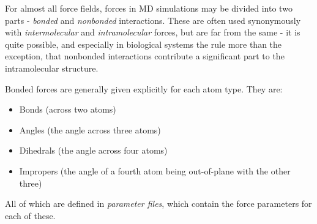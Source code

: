 \documentclass[oneside]{scrreprt}
\begin{document}
For almost all force fields, forces in MD simulations may be divided into two parts - \emph{bonded} and \emph{nonbonded} interactions. These are often used synonymously with \emph{intermolecular} and \emph{intramolecular} forces, but are far from the same - it is quite possible, and especially in biological systems the rule more than the exception, that nonbonded interactions contribute a significant part to the intramolecular structure.

Bonded forces are generally given explicitly for each atom type. They are:
\begin{itemize}
    \item Bonds (across two atoms)
    \item Angles (the angle across three atoms)
    \item Dihedrals (the angle across four atoms)
    \item Impropers (the angle of a fourth atom being out-of-plane with the other three)
\end{itemize}

All of which are defined in \emph{parameter files}, which contain the force parameters for each of these.
\end{document}
